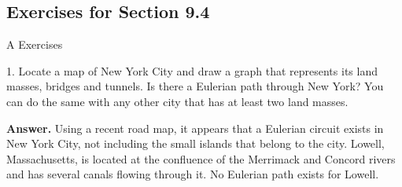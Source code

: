 \documentclass[10pt,]{book}
\theoremstyle{plain}
\theoremstyle{definition}
\theoremstyle{definition}
\theoremstyle{definition}
\theoremstyle{definition}
\theoremstyle{definition}
\numberwithin{equation}{section}
\begin{document}
\subsection[Exercises for Section 9.4]{Exercises for Section 9.4}\label{exercises-9-4}
\hypertarget{exercisegroup-5}{}\typeout{************************************************}
\typeout{************************************************}
A Exercises%
\begin{exercisegroup}
\item[1.]\hypertarget{exercise-21}{} Locate a map of New York City and draw a graph that represents its land masses, bridges and tunnels. Is there a Eulerian path through New York? You can do the same with any other city that has at least two land masses.%
\par\smallskip
\par\smallskip
\noindent\textbf{Answer.}\hypertarget{answer-6}{}\quad
 Using a recent road map, it appears that a Eulerian circuit exists in New York City, not including the small islands that belong to the city.
Lowell, Massachusetts, is located at the confluence of the Merrimack and Concord rivers and has several canals flowing through it. No Eulerian path
exists for Lowell.


\end{exercisegroup}
\end{document}
